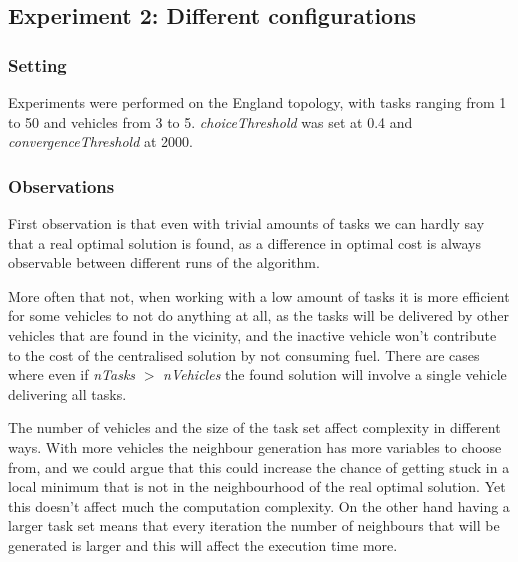 \documentclass[11pt]{article}
\begin{document}
\subsection{Experiment 2: Different configurations}

\subsubsection{Setting}

Experiments were performed on the England topology, with tasks ranging from 1 to 50 and vehicles from 3 to 5. \textit{choiceThreshold} was set at 0.4 and \textit{convergenceThreshold} at 2000.

\subsubsection{Observations}

First observation is that even with trivial amounts of tasks we can hardly say that a real optimal solution is found, as a difference in optimal cost is always observable between different runs of the algorithm.

More often that not, when working with a low amount of tasks it is more efficient for some vehicles to not do anything at all, as the tasks will be delivered by other vehicles that are found in the vicinity, and the inactive vehicle won't contribute to the cost of the centralised solution by not consuming fuel. There are cases where even if \textit{nTasks} $>$ \textit{nVehicles} the found solution will involve a single vehicle delivering all tasks.

The number of vehicles and the size of the task set affect complexity in different ways. With more vehicles the neighbour generation has more variables to choose from, and we could argue that this could increase the chance of getting stuck in a local minimum that is not in the neighbourhood of the real optimal solution. Yet this doesn't affect much the computation complexity. On the other hand having a larger task set means that every iteration the number of neighbours that will be generated is larger and this will affect the execution time more. 
\end{document}
